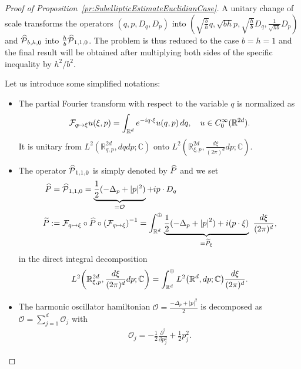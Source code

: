 \documentclass[AHL,Unicode,longabstracts]{cedram}
\newcommand{\C}{\mathbb{C}}
\newcommand{\R}{\mathbb{R}}
\newcommand{\clO}{\mathcal{O}}
\newcommand{\clP}{\mathcal{P}}
\newcommand{\clF}{\mathcal{F}}
\newcommand{\p}{\partial}
\newcommand{\abs}[1]{\left| #1 \right|}
\newcommand*{\Mk}{\mkern -2mu}
\newcommand*{\MK}{\mkern 2mu}
\let\oldhat\hat
\renewcommand*{\hat}[1]{\mathchoice{\widehat{#1}}{\widehat{#1}}{\oldhat{#1}}{\oldhat{#1}}}
\let\originalleft\left
\let\originalright\right
\renewcommand{\left}{\mathopen{}\mathclose\bgroup\originalleft}
\renewcommand{\right}{\aftergroup\egroup\originalright}
\let\oldmapsto\mapsto
\renewcommand*{\mapsto}{\mathchoice{\longmapsto}{\oldmapsto}{\oldmapsto}{\oldmapsto}}
\begin{document}
\begin{proof}[{Proof of Proposition~\ref{pr:SubellipticEstimateEuclidianCase}}]
A unitary change of scale transforms the operators $(q,p,D_q,D_p)$ into $ (\sqrt{\frac{b}{h}}q, \sqrt{bh}p, \sqrt{\frac{h}{b}} D_q, \frac{1}{\sqrt{hb}}D_p)$ and $\hat{\clP}_{b,h,0}$ into $\frac{h}{b}\hat{\clP}_{1,1,0}$. The problem is thus reduced to the case $b=h=1$ and the final result will be obtained after multiplying both sides of the specific inequality by $h^2/b^2$.

Let us introduce some simplified notations:
\begin{itemize}
\item The partial Fourier transform with respect to the variable $q$ is normalized as
\begin{equation}
\clF_{q \mapsto \xi} u(\xi, p) = \int_{\R^d} e^{-i q \cdot \xi} u(q,p) \, dq, \quad u \in C^\infty_0(\R^{2d}).
\end{equation}
It is unitary from $L^2(\R^{2d}_{q,p},dqdp;\C)$ onto $L^2(\R^{2d}_{\xi,p},\frac{d\xi}{(2\pi)^{d}}dp; \C)$.
\item The operator $\hat{\clP}_{1,1,0}$ is simply denoted by $\hat{P}$ and we set
\begin{equation}\label{conjugation_partial_FT}
\begin{aligned}
\hat{P}&=\hat{\clP}_{1,1,0}=\underbrace{\frac{1}{2}(-\Delta_{p} + |p|^{2})}_{=\clO} + i p\cdot D_q\\
\widetilde{P} \,\MK &\!\Mk:= \clF_{q \mapsto \xi} \circ \hat{P} \circ \left(\clF_{q \mapsto \xi}\right)^{-1} = \int_{\R^d}^{\oplus}\underbrace{\frac{1}{2}(-\Delta_p + \abs{p}^2)+i (p\cdot\xi)}_{=\widetilde{P}_{\xi}}~\frac{d\xi}{(2\pi)^d},
\end{aligned}
\end{equation}
in the direct integral decomposition
\[
L^2\left(\R^{2d}_{\xi,p},\frac{d\xi}{(2\pi)^d}dp;\C\right)=\int_{\R^d}^{\oplus}L^2\left(\R^d,dp;\C\right) \frac{d\xi}{(2\pi)^d}.
\]
\item The harmonic oscillator hamiltonian $\clO=\frac{-\Delta_p+|p|^2}{2}$ is decomposed as $\clO=\sum_{j=1}^{d}\clO_j$ with
\begin{align*}
\clO_j = -\frac{1}{2} \frac{\p^2}{\p p_j^2} + \frac{1}{2} p_j^2.
\end{align*}


\end{itemize}
\end{proof}
\end{document}
